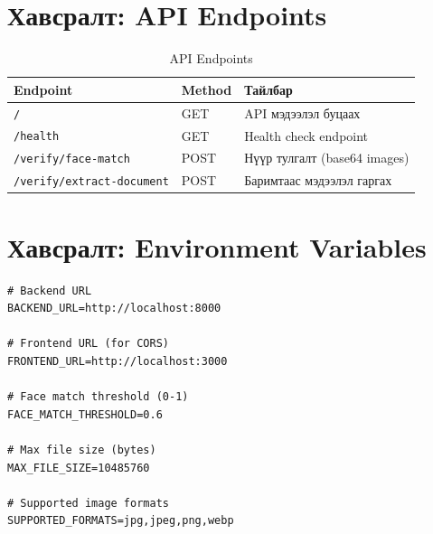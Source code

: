 \documentclass[12pt,a4paper]{article}
\begin{document}
\newpage
\appendix
\section{Хавсралт: API Endpoints}

\begin{table}[H]
\centering
\begin{tabular}{|p{4cm}|p{2cm}|p{6.5cm}|}
\hline
\textbf{Endpoint} & \textbf{Method} & \textbf{Тайлбар} \\
\hline
\texttt{/} & GET & API мэдээлэл буцаах \\
\hline
\texttt{/health} & GET & Health check endpoint \\
\hline
\texttt{/verify/face-match} & POST & Нүүр тулгалт (base64 images) \\
\hline
\texttt{/verify/extract-document} & POST & Баримтаас мэдээлэл гаргах \\
\hline
\end{tabular}
\caption{API Endpoints}
\end{table}

\section{Хавсралт: Environment Variables}

\begin{lstlisting}[caption={.env file example}]
# Backend URL
BACKEND_URL=http://localhost:8000

# Frontend URL (for CORS)
FRONTEND_URL=http://localhost:3000

# Face match threshold (0-1)
FACE_MATCH_THRESHOLD=0.6

# Max file size (bytes)
MAX_FILE_SIZE=10485760

# Supported image formats
SUPPORTED_FORMATS=jpg,jpeg,png,webp
\end{lstlisting}
\end{document}
